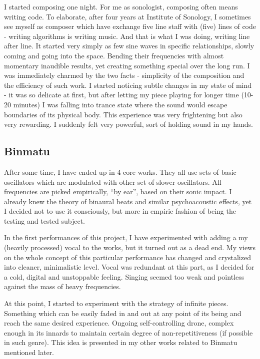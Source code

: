 \documentclass[11pt,a4paper,oneside]{report}
\begin{document}
I started composing one night. For me as sonologist, composing often means writing code. To elaborate, after four years at Institute of Sonology, I sometimes see myself as composer which have exchange five line staff with (five) lines of code - writing algorithms is writing music. And that is what I was doing, writing line after line. It started very simply as few sine waves in specific relationships, slowly coming and going into the space. Bending their frequencies with almost momentary inaudible results, yet creating something special over the long run. I was immediately charmed by the two facts - simplicity of the composition and the efficiency of such work. I started noticing subtle changes in my state of mind - it was so delicate at first, but after letting my piece playing for longer time (10-20 minutes) I was falling into trance state where the sound would escape boundaries of its physical body. This experience was very frightening but also very rewarding. I suddenly felt very powerful, sort of holding sound in my hands. 

\subsection{Binmatu} After some time, I have ended up in 4 core works. They all use sets of basic oscillators which are modulated with other set of slower oscillators. All frequencies are picked empirically, ``by ear'', based on their sonic impact. I already knew the theory of binaural beats and similar psychoacoustic effects, yet I decided not to use it consciously, but more in empiric fashion of being the testing and tested subject.

In the first performances of this project, I have experimented with adding a my (heavily processed) vocal to the works, but it turned out as a dead end. My views on the whole concept of this particular performance has changed and crystalized into cleaner, minimalistic level. Vocal was redundant at this part, as I decided for a cold, digital and unstoppable feeling. Singing seemed too weak and pointless against the mass of heavy frequencies. 

At this point, I started to experiment with the strategy of infinite pieces. Something which can be easily faded in and out at any point of its being and reach the same desired experience. Ongoing self-controlling drone, complex enough in its innards to maintain certain degree of non-repetitiveness (if possible in such genre). This idea is presented in my other works related to Binmatu mentioned later. 
\end{document}
